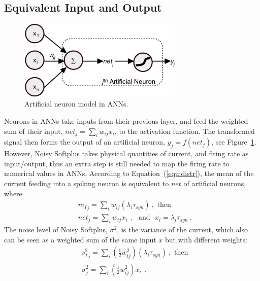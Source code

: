 \documentclass[runningheads,a4paper]{llncs}
\begin{document}
\subsection{Equivalent Input and Output}

\begin{figure}[bt]
	\centering
	\includegraphics[width=0.7\textwidth]{neuron.pdf}
	\caption{Artificial neuron model in ANNs. }
	\label{Fig:neuron}
\end{figure}
Neurons in ANNs take inputs from their previous layer, and feed the weighted sum of their input, $net_j = \sum_i w_{ij}x_i$, to the activation function.
The transformed signal then forms the output of an artificial neuron, $y_j=f(net_j)$, see Figure~\ref{Fig:neuron}.	
However, Noisy Softplus takes physical quantities of current, and firing rate as input/output, thus an extra step is still needed to map the firing rate to numerical values in ANNs.
According to Equation~(\ref{equ:distr}), the mean of the current feeding into a spiking neuron is equivalent to $net$ of artificial neurons, where
\begin{equation}
\begin{aligned}
& {m_I}_j = \sum_i w_{ij}(\lambda_{i}\tau_{syn})~, \textrm{  then}\\
& net_j= \sum_i w_{ij} x_i~~, \textrm{~~and~~}
x_i = \lambda_{i}\tau_{syn}~.
\end{aligned}
\label{equ:mi_input}
\end{equation}
The noise level of Noisy Softplus, $\sigma^2$, is the variance of the current, which also can be seen as a weighted sum of the same input $x$ but with different weights:
\begin{equation}
\begin{aligned}
& {s_I^2}_j=\sum_i(\frac{1}{2} w_{ij}^2) (\lambda_{i}\tau_{syn})~, \textrm{  then}\\
& \sigma^2_j= \sum_i (\frac{1}{2} w_{ij}^2) x_i~~.
\end{aligned}
\label{equ:si_input}
\end{equation}
\end{document}

